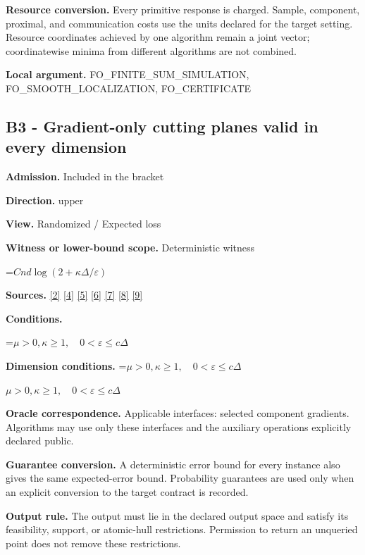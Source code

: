 \documentclass[10pt,a4paper]{article}
\newcommand{\AtlasMath}[1]{\par\begingroup\centering\setbox0=\hbox{$\displaystyle #1$}\ifdim\wd0>1.4\linewidth\typeout{ATLAS WIDE FORMULA: \the\wd0}\fi\ifdim\wd0>\linewidth\resizebox{\linewidth}{!}{\box0}\else\box0\fi\par\endgroup}
\newcommand{\AtlasInlineMath}[1]{\begingroup\setbox0=\hbox{$#1$}\ifdim\wd0>.4\linewidth\endgroup\AtlasMath{#1}\else\endgroup$#1$\fi}
\begin{document}
\textbf{Resource conversion.} Every primitive response is charged. Sample, component, proximal, and communication costs use the units declared for the target setting. Resource coordinates achieved by one algorithm remain a joint vector; coordinatewise minima from different algorithms are not combined.

\textbf{Local argument.} FO\_\allowbreak{}FINITE\_\allowbreak{}SUM\_\allowbreak{}SIMULATION, FO\_\allowbreak{}SMOOTH\_\allowbreak{}LOCALIZATION, FO\_\allowbreak{}CERTIFICATE

\subsection{B3 - Gradient-only cutting planes valid in every dimension}
\textbf{Admission.} Included in the bracket

\textbf{Direction.} upper

\textbf{View.} Randomized / Expected loss

\textbf{Witness or lower-bound scope.} Deterministic witness

\AtlasMath{Cnd\log(2+\kappa\Delta/\varepsilon)}
\textbf{Sources.} \href{https://proceedings.mlr.press/v97/zhou19b/zhou19b.pdf}{[2]} \href{https://arxiv.org/pdf/1405.4980}{[4]} \href{https://arxiv.org/pdf/2101.09740v2}{[5]} \href{https://arxiv.org/pdf/2609.33360v2}{[6]} \href{https://arxiv.org/pdf/2609.10874}{[7]} \href{https://www2.isye.gatech.edu/~nemirovs/MOR_AccuracyCertificates.pdf}{[8]} \href{https://arxiv.org/pdf/2609.20701}{[9]}

\textbf{Conditions.} 
\AtlasMath{\mu>0,\kappa\ge1,\quad0<\varepsilon\le c\Delta}


\textbf{Dimension conditions.} \AtlasInlineMath{\mu>0,\kappa\ge1,\quad0<\varepsilon\le c\Delta}

\textbf{Oracle correspondence.} Applicable interfaces: selected component gradients. Algorithms may use only these interfaces and the auxiliary operations explicitly declared public.

\textbf{Guarantee conversion.} A deterministic error bound for every instance also gives the same expected-error bound. Probability guarantees are used only when an explicit conversion to the target contract is recorded.

\textbf{Output rule.} The output must lie in the declared output space and satisfy its feasibility, support, or atomic-hull restrictions. Permission to return an unqueried point does not remove these restrictions.
\end{document}
